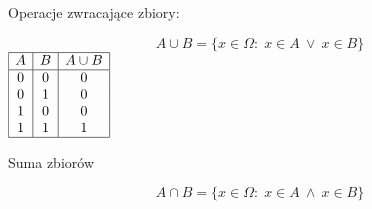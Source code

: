 \documentclass{SGGW-thesis}
\begin{document}
 \begin{paragraph}{}
Operacje zwracające zbiory:
 \begin{table}[h]
 \parbox{.45\linewidth}{
 \centering
 \begin{equation}
    A \cup B = \{x \in \Omega:\; x \in A \:\vee\: x \in B\}
\end{equation}
        $\begin{array}{|c|c|c|}
            \hline
            A & B & A \cup B \\
            \hline
            0 & 0 & 0 \\
            0 & 1 & 0 \\
            1 & 0 & 0 \\
            1 & 1 & 1 \\
            \hline
            
        \end{array}$
    \caption{Suma zbiorów}
}
 \parbox{.45\linewidth}{
 \centering
\begin{equation}
    A \cap B = \{x \in \Omega:\; x \in A \:\wedge\: x \in B\}
\end{equation}


}
\end{table}
\end{paragraph}
\end{document}
